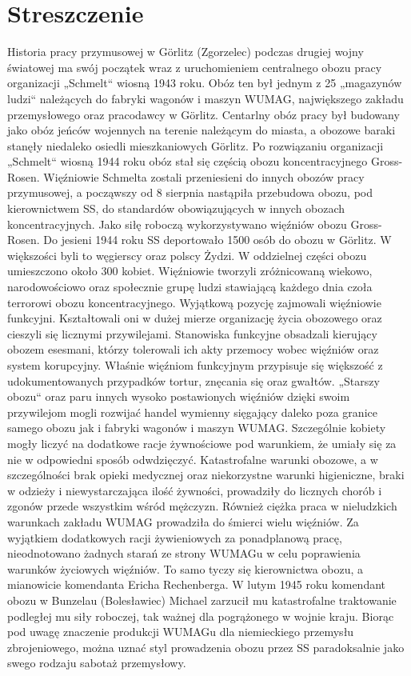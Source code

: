 \section{Streszczenie}
Historia pracy przymusowej w Görlitz (Zgorzelec) podczas drugiej wojny światowej ma swój początek wraz z uruchomieniem centralnego obozu pracy organizacji „Schmelt“ wiosną 1943 roku. Obóz ten był jednym z 25 „magazynów ludzi“ należących do  fabryki wagonów i maszyn WUMAG, największego zakładu przemysłowego oraz pracodawcy w Görlitz. Centarlny obóz pracy był budowany jako obóz jeńców wojennych na terenie należącym do miasta, a obozowe baraki stanęły niedaleko osiedli mieszkaniowych Görlitz. Po rozwiązaniu organizacji „Schmelt“ wiosną 1944 roku obóz stał się częścią obozu koncentracyjnego Gross-Rosen. Więźniowie Schmelta zostali przeniesieni do innych obozów pracy przymusowej, a począwszy od 8 sierpnia nastąpiła przebudowa obozu, pod kierownictwem SS,  do standardów obowiązujących w innych obozach koncentracyjnych. Jako siłę roboczą wykorzystywano więźniów obozu Gross-Rosen. Do jesieni 1944 roku SS deportowało 1500 osób do obozu w Görlitz. W większości byli to węgierscy oraz polscy Żydzi. W oddzielnej części obozu umieszczono około 300 kobiet.
Więźniowie tworzyli zróżnicowaną wiekowo, narodowościowo oraz społecznie grupę ludzi stawiającą każdego dnia czoła terrorowi obozu koncentracyjnego. Wyjątkową pozycję zajmowali więźniowie funkcyjni. Kształtowali oni w dużej mierze organizację życia obozowego oraz cieszyli się licznymi przywilejami. Stanowiska funkcyjne obsadzali kierujący obozem esesmani, którzy tolerowali ich akty przemocy wobec więźniów oraz  system korupcyjny. Właśnie więźniom funkcyjnym przypisuje się większość z udokumentowanych przypadków tortur, znęcania się oraz gwałtów. „Starszy obozu“ oraz paru innych wysoko postawionych więźniów dzięki swoim przywilejom mogli rozwijać handel wymienny sięgający daleko poza granice samego obozu jak i fabryki wagonów i maszyn WUMAG. Szczególnie kobiety mogły liczyć na dodatkowe racje żywnościowe pod warunkiem, że umiały się za nie w odpowiedni sposób odwdzięczyć.
Katastrofalne warunki obozowe, a w szczególności brak opieki medycznej oraz niekorzystne warunki higieniczne, braki w odzieży i niewystarczająca ilość żywności, prowadziły do licznych chorób i zgonów przede wszystkim wśród mężczyzn. Również ciężka praca w nieludzkich warunkach zakładu WUMAG prowadziła do śmierci wielu więźniów. Za wyjątkiem dodatkowych racji żywieniowych za ponadplanową pracę, nieodnotowano żadnych starań ze strony WUMAGu w celu poprawienia warunków życiowych więźniów. To samo tyczy się kierownictwa obozu, a mianowicie komendanta Ericha Rechenberga. W lutym 1945 roku komendant obozu w Bunzelau (Bolesławiec) Michael zarzucił mu katastrofalne traktowanie podległej mu siły roboczej, tak ważnej dla pogrążonego w wojnie kraju. Biorąc pod uwagę znaczenie produkcji WUMAGu dla niemieckiego przemysłu zbrojeniowego, można uznać styl prowadzenia obozu przez SS paradoksalnie jako swego rodzaju sabotaż przemysłowy.
